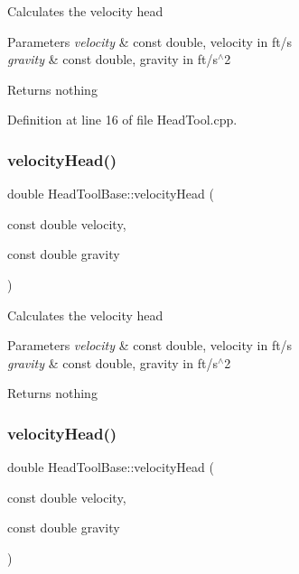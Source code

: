 Calculates the velocity head


\begin{DoxyParams}{Parameters}
{\em velocity} & const double, velocity in ft/s \\
\hline
{\em gravity} & const double, gravity in ft/s$^\wedge$2\\
\hline
\end{DoxyParams}
\begin{DoxyReturn}{Returns}
nothing 
\end{DoxyReturn}


Definition at line 16 of file Head\+Tool.\+cpp.

\mbox{\label{class_head_tool_base_a1dbece05fc1a248fa2aa64b6f09602f6}} 
\subsubsection{\texorpdfstring{velocity\+Head()}{velocityHead()}\hspace{0.1cm}{\footnotesize\ttfamily [2/3]}}
{\footnotesize\ttfamily double Head\+Tool\+Base\+::velocity\+Head (\begin{DoxyParamCaption}\item[{const double}]{velocity,  }\item[{const double}]{gravity }\end{DoxyParamCaption})\hspace{0.3cm}{\ttfamily [protected]}}

Calculates the velocity head


\begin{DoxyParams}{Parameters}
{\em velocity} & const double, velocity in ft/s \\
\hline
{\em gravity} & const double, gravity in ft/s$^\wedge$2\\
\hline
\end{DoxyParams}
\begin{DoxyReturn}{Returns}
nothing 
\end{DoxyReturn}
\mbox{\label{class_head_tool_base_a1dbece05fc1a248fa2aa64b6f09602f6}} 
\subsubsection{\texorpdfstring{velocity\+Head()}{velocityHead()}\hspace{0.1cm}{\footnotesize\ttfamily [3/3]}}
{\footnotesize\ttfamily double Head\+Tool\+Base\+::velocity\+Head (\begin{DoxyParamCaption}\item[{const double}]{velocity,  }\item[{const double}]{gravity }\end{DoxyParamCaption})\hspace{0.3cm}{\ttfamily [protected]}}

